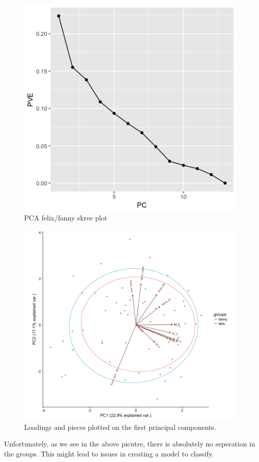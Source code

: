 \documentclass[12pt,twoside]{reedthesis}
\theoremstyle{definition}
\theoremstyle{definition}
\theoremstyle{definition}
\theoremstyle{remark}
\begin{document}
\begin{figure}[h]
\centering
\includegraphics[scale = .5]{images/fpca_skree.png}
\caption{PCA felix/fanny skree plot}
\label{subd}
\end{figure}
\begin{figure}[h]
\centering
\includegraphics[scale = .3]{images/ff_elipse12.png}
\caption{Loadings and pieces plotted on the first principal components. }
\label{subd}
\end{figure}
Unfortunately, as we see in the above picutre, there is absolutely no
seperation in the groups. This might lead to issues in creating a model
to classify.
\end{document}
